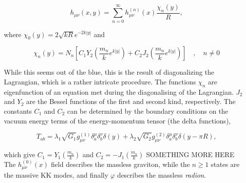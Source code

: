 \documentclass[11pt,a4paper]{article}
\begin{document}
\begin{equation}
	h_{\mu\nu}(x,y) = \sum_{n=0}^{\infty} h_{\mu\nu}^{(n)}(x)\frac{\chi_n(y)}{R},
\end{equation}

where $\chi_0(y) = 2\sqrt{kR}e^{-2k|y|}$ and

\begin{equation}
	\chi_n(y) = N_n\left[ C_1Y_2\left(\frac{m_n}{k}e^{k|y|}\right) +   C_2J_2\left(\frac{m_n}{k}e^{k|y|}\right)\right] \quad,\quad n\neq 0
\end{equation}

While this seems out of the blue, this is the result of diagonalizing the Lagrangian, which is a rather intricate procedure. The functions $\chi_n$ are eigenfunction of an equation met during the diagonalising of the Lagrangian. $J_2$ and $Y_2$ are the Bessel functions of the first and second kind, respectively. The constants $C_1$ and $C_2$ can be determined by the boundary conditions on the vacuum energy terms of the energy-momentum tensor (the delta functions),

\begin{equation}
	T_{ab} = \lambda_1\sqrt{G_1}g_{\mu\nu}^{(1)}\delta_a^\mu\delta_b^\nu\delta(y) + \lambda_2\sqrt{G_2}g_{\mu\nu}^{(2)}\delta_a^\mu\delta_b^\nu\delta(y-\pi R),
\end{equation}

which give $C_1 = Y_1\left(\frac{m_n}{k}\right)$ and $C_2 = -J_1\left(\frac{m_n}{k}\right)$ SOMETHING MORE HERE\\

The $h_{\mu\nu}^{(0)}(x)$ field describes the massless graviton, while the $n\geq 1$ states are the massive KK modes, and finally $\varphi$ describes the massless \emph{radion}.
\end{document}
